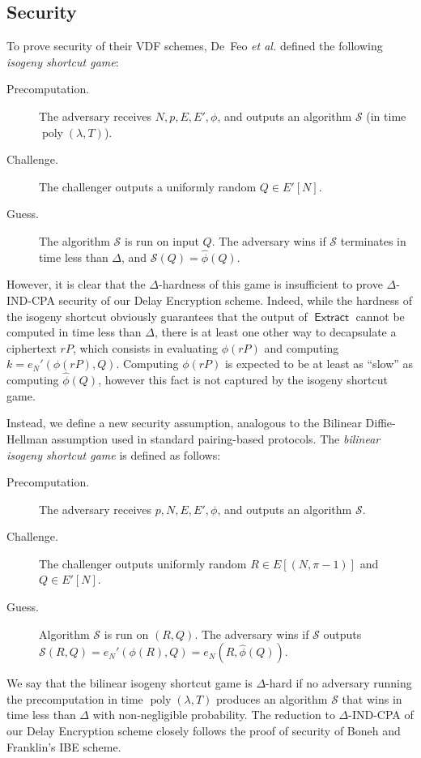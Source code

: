 \documentclass{llncs}
\DeclareMathOperator{\poly}{poly}
\DeclareMathOperator{\Extract}{\mathsf{Extract}}
\begin{document}
\subsection{Security}

To prove security of their VDF schemes, De~Feo \emph{et al.} defined
the following \emph{isogeny shortcut game}:

\begin{description}
\item[Precomputation.] The adversary receives $N,p,E,E',\phi$, and
  outputs an algorithm $\mathcal{S}$ (in time $\poly(\lambda,T)$).
\item[Challenge.] The challenger outputs a uniformly random
  $Q\in E'[N]$.
\item[Guess.] The algorithm $\mathcal{S}$ is run on input $Q$. The
  adversary wins if $\mathcal{S}$ terminates in time less than
  $\Delta$, and $\mathcal{S}(Q) = \hat\phi(Q)$.
\end{description}

However, it is clear that the $\Delta$-hardness of this game is
insufficient to prove $\Delta$-IND-CPA security of our Delay
Encryption scheme. %
Indeed, while the hardness of the isogeny shortcut obviously
guarantees that the output of $\Extract$ cannot be computed in time
less than $\Delta$, there is at least one other way to decapsulate a
ciphertext $rP$, which consists in evaluating $\phi(rP)$ and computing
$k=e_N'(\phi(rP), Q)$. %
Computing $\phi(rP)$ is expected to be at least as ``slow'' as
computing $\hat\phi(Q)$, however this fact is not captured by the
isogeny shortcut game.

Instead, we define a new security assumption, analogous to the
Bilinear Diffie-Hellman assumption used in standard pairing-based
protocols. %
The \emph{bilinear isogeny shortcut game} is defined as follows:

\begin{description}
\item[Precomputation.] The adversary receives $p,N,E,E',\phi$, and
  outputs an algorithm $\mathcal{S}$.
\item[Challenge.] The challenger outputs uniformly random
  $R\in E[(N,\pi-1)]$ and $Q\in E'[N]$.
\item[Guess.] Algorithm $\mathcal{S}$ is run on $(R,Q)$. The adversary
  wins if $\mathcal{S}$ outputs
  $\mathcal{S}(R,Q) = e_N'(\phi(R),Q) = e_N(R,\hat\phi(Q))$.
\end{description}

We say that the bilinear isogeny shortcut game is $\Delta$-hard if no
adversary running the precomputation in time $\poly(\lambda,T)$
produces an algorithm $\mathcal{S}$ that wins in time less than
$\Delta$ with non-negligible probability. %
The reduction to $\Delta$-IND-CPA of our Delay Encryption scheme
closely follows the proof of security of Boneh and Franklin's IBE
scheme.
\end{document}

